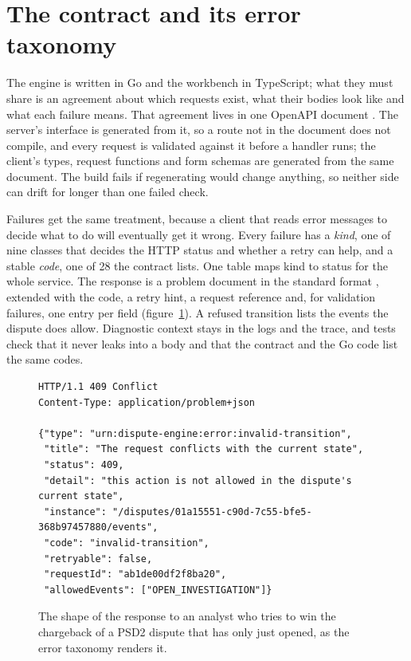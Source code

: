 \section{The contract and its error taxonomy}
\label{sec:design-failures}

The engine is written in Go and the workbench in TypeScript; what they must share is an agreement about which
requests exist, what their bodies look like and what each failure means. That agreement lives in one OpenAPI
document \cite{openapi}. The server's interface is generated from it, so a route not in the document does not compile, and
every request is validated against it before a handler runs; the client's types, request functions and form
schemas are generated from the same document. The build fails if regenerating would change anything, so neither
side can drift for longer than one failed check.

Failures get the same treatment, because a client that reads error messages to decide what to do will eventually
get it wrong. Every failure has a \emph{kind}, one of nine classes that decides the HTTP status and whether a
retry can help, and a stable \emph{code}, one of 28 the contract lists. One table maps kind to status for the whole
service. The response is a problem document in the standard format \cite{rfc9457}, extended with the code, a
retry hint, a request reference and, for validation failures, one entry per field (figure~\ref{fig:problem}). A
refused transition lists the events the dispute does allow. Diagnostic context stays in the logs and the trace,
and tests check that it never leaks into a body and that the contract and the Go code list the same codes.

\begin{figure}[htbp]
\begin{lstlisting}
HTTP/1.1 409 Conflict
Content-Type: application/problem+json

{"type": "urn:dispute-engine:error:invalid-transition",
 "title": "The request conflicts with the current state",
 "status": 409,
 "detail": "this action is not allowed in the dispute's current state",
 "instance": "/disputes/01a15551-c90d-7c55-bfe5-368b97457880/events",
 "code": "invalid-transition",
 "retryable": false,
 "requestId": "ab1de00df2f8ba20",
 "allowedEvents": ["OPEN_INVESTIGATION"]}
\end{lstlisting}
\caption{The shape of the response to an analyst who tries to win the chargeback of a PSD2 dispute that has only
just opened, as the error taxonomy renders it.}
\label{fig:problem}
\end{figure}


